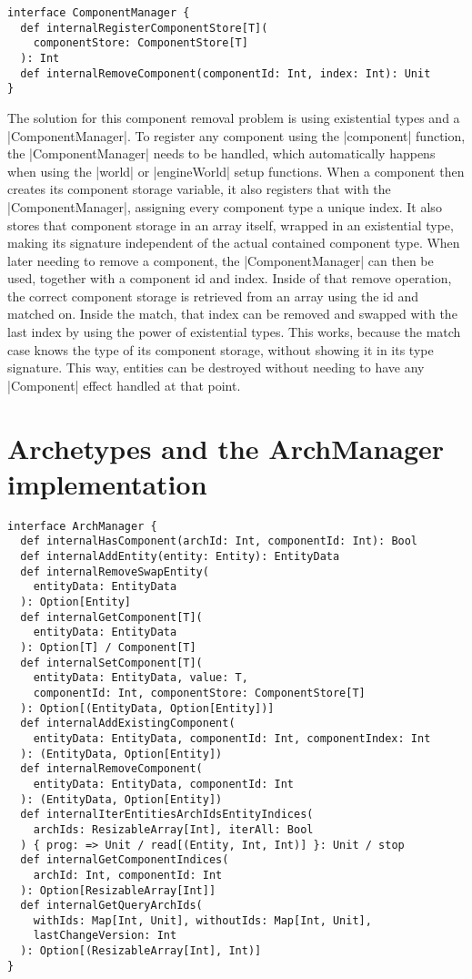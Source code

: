 \begin{lstlisting}[caption=ComponentManager signiture]
interface ComponentManager {
  def internalRegisterComponentStore[T](
    componentStore: ComponentStore[T]
  ): Int
  def internalRemoveComponent(componentId: Int, index: Int): Unit
}
\end{lstlisting}

The solution for this component removal problem is using existential types and a |ComponentManager|. To register any component using the |component| function, the |ComponentManager| needs to be handled, which automatically happens when using the |world| or |engineWorld| setup functions. When a component then creates its component storage variable, it also registers that with the |ComponentManager|, assigning every component type a unique index. It also stores that component storage in an array itself, wrapped in an existential type, making its signature independent of the actual contained component type. When later needing to remove a component, the |ComponentManager| can then be used, together with a component id and index. Inside of that remove operation, the correct component storage is retrieved from an array using the id and matched on. Inside the match, that index can be removed and swapped with the last index by using the power of existential types. This works, because the match case knows the type of its component storage, without showing it in its type signature. This way, entities can be destroyed without needing to have any |Component| effect handled at that point.

\section{Archetypes and the ArchManager implementation}

\begin{lstlisting}[caption=ArchManager signiture]
interface ArchManager {
  def internalHasComponent(archId: Int, componentId: Int): Bool
  def internalAddEntity(entity: Entity): EntityData
  def internalRemoveSwapEntity(
    entityData: EntityData
  ): Option[Entity]
  def internalGetComponent[T](
    entityData: EntityData
  ): Option[T] / Component[T]
  def internalSetComponent[T](
    entityData: EntityData, value: T,
	componentId: Int, componentStore: ComponentStore[T]
  ): Option[(EntityData, Option[Entity])]
  def internalAddExistingComponent(
    entityData: EntityData, componentId: Int, componentIndex: Int
  ): (EntityData, Option[Entity])
  def internalRemoveComponent(
    entityData: EntityData, componentId: Int
  ): (EntityData, Option[Entity])
  def internalIterEntitiesArchIdsEntityIndices(
    archIds: ResizableArray[Int], iterAll: Bool
  ) { prog: => Unit / read[(Entity, Int, Int)] }: Unit / stop
  def internalGetComponentIndices(
    archId: Int, componentId: Int
  ): Option[ResizableArray[Int]]
  def internalGetQueryArchIds(
    withIds: Map[Int, Unit], withoutIds: Map[Int, Unit],
	lastChangeVersion: Int
  ): Option[(ResizableArray[Int], Int)]
}
\end{lstlisting}

